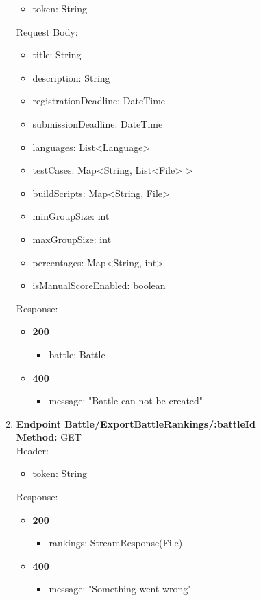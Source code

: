 \begin{enumerate}
\begin{itemize}
        \item token: String
    \end{itemize}
    Request Body:\\
    \begin{itemize}
        \item title: String
        \item description: String
        \item registrationDeadline: DateTime
        \item submissionDeadline: DateTime
        \item languages: List<Language>
        \item testCases: Map<String, List<File> >
        \item buildScripts: Map<String, File>
        \item minGroupSize: int
        \item maxGroupSize: int
        \item percentages: Map<String, int>
        \item isManualScoreEnabled: boolean
    \end{itemize}
    Response:\\
    \begin{itemize}
        \item \textbf{200} \\
        \begin{itemize}
            \item battle: Battle
        \end{itemize}
        \item \textbf{400} \\
        \begin{itemize}
            \item message: "Battle can not be created"
        \end{itemize}
    \end{itemize}
    \item \textbf{Endpoint Battle/ExportBattleRankings/:battleId} \\
    \textbf{Method:} GET \\
    Header:\\
    \begin{itemize}
        \item token: String
    \end{itemize}
    Response:\\
    \begin{itemize}
        \item \textbf{200} \\
        \begin{itemize}
            \item rankings: StreamResponse(File)
        \end{itemize}
        \item \textbf{400} \\
        \begin{itemize}
            \item message: "Something went wrong"
        \end{itemize}
    \end{itemize}
\end{enumerate}
\newpage
